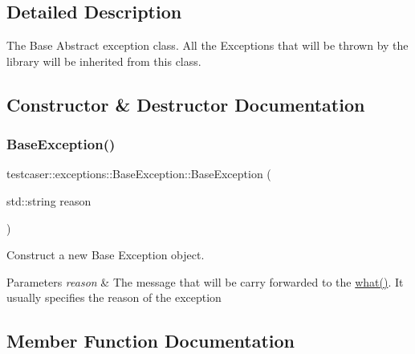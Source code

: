 \subsection{Detailed Description}
The Base Abstract exception class. All the Exceptions that will be thrown by the library will be inherited from this class. 

\subsection{Constructor \& Destructor Documentation}
\mbox{\label{classtestcaser_1_1exceptions_1_1BaseException_a70b5f42e6197e2600f7163f843060af2}} 
\subsubsection{\texorpdfstring{Base\+Exception()}{BaseException()}}
{\footnotesize\ttfamily testcaser\+::exceptions\+::\+Base\+Exception\+::\+Base\+Exception (\begin{DoxyParamCaption}\item[{std\+::string}]{reason }\end{DoxyParamCaption})\hspace{0.3cm}{\ttfamily [inline]}}



Construct a new Base Exception object. 


\begin{DoxyParams}{Parameters}
{\em reason} & The message that will be carry forwarded to the \hyperlink{classtestcaser_1_1exceptions_1_1BaseException_a76d41683a93c7c45cd446ee161344f05}{what()}. It usually specifies the reason of the exception \\
\hline
\end{DoxyParams}


\subsection{Member Function Documentation}
\mbox{\label{classtestcaser_1_1exceptions_1_1BaseException_a92c371d40b0f3dbaa7de968ea67e5211}} 
